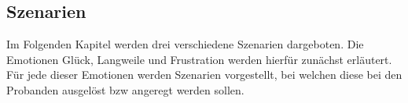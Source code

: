 \subsection{Szenarien} \label{szenarien-1}



Im Folgenden Kapitel werden drei verschiedene Szenarien dargeboten. Die Emotionen Gl{\"u}ck, Langweile und Frustration werden hierf{\"u}r zun{\"a}chst erl{\"a}utert. F{\"u}r jede dieser Emotionen werden Szenarien vorgestellt, bei welchen diese bei den Probanden ausgel{\"o}st bzw angeregt werden sollen.






